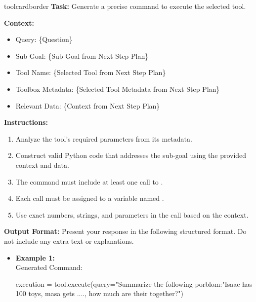 \begin{custombox}[title=Instruction for {Tool Executor}]{toolcardborder}
\textbf{Task:} Generate a precise command to execute the selected tool.

\vspace{6pt}

\noindent\textbf{Context:}
\begin{itemize}[left=0pt, label={}, itemsep=0pt, parsep=0pt]
 \item{Query:} {\{{Question}\}}
    
 \item{Sub-Goal:} {\{{Sub Goal} {from Next Step Plan}\}}
    
 \item{Tool Name:} {\{{Selected Tool} {from Next Step Plan}\}}
    
 \item{Toolbox Metadata:}  \{{{Selected Tool Metadata}} {from Next Step Plan}\}
    
 \item{Relevant Data:} {\{{Context} {from Next Step Plan}\}}
\end{itemize}

\vspace{6pt}

\noindent\textbf{Instructions:}
\begin{enumerate}[left=0pt, itemsep=0pt, parsep=0pt]
    \item Analyze the tool's required parameters from its metadata.
    \item Construct valid Python code that addresses the sub-goal using the provided context and data.
    \item The command must include at least one call to .
    \item Each  call must be assigned to a variable named {}.
    \item Use exact numbers, strings, and parameters in the  call based on the context.
\end{enumerate}

\vspace{6pt}

\noindent\textbf{Output Format:}
Present your response in the following structured format. Do not include any extra text or explanations.

\vspace{4pt}

\begin{itemize}[left=3pt, label={}, itemsep=0pt, parsep=0pt]
\item \hspace{-3mm}\textbf{Example 1:}\\
Generated Command:
\begin{simplecode}
execution = tool.execute(query="Summarize the following porblom:"Isaac has 100 toys, masa gets ...., how much are their together?")
\end{simplecode}


\end{itemize}
\end{custombox}
